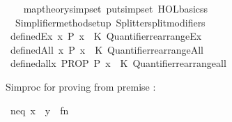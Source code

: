 \begin{isabellebody}
\isamarkupfalse%
\ {\isacartoucheopen}\isanewline
\ \ map{\isacharunderscore}{\kern0pt}theory{\isacharunderscore}{\kern0pt}simpset\ {\isacharparenleft}{\kern0pt}put{\isacharunderscore}{\kern0pt}simpset\ HOL{\isacharunderscore}{\kern0pt}basic{\isacharunderscore}{\kern0pt}ss{\isacharparenright}{\kern0pt}\ {\isacharhash}{\kern0pt}{\isachargreater}{\kern0pt}\isanewline
\ \ Simplifier{\isachardot}{\kern0pt}method{\isacharunderscore}{\kern0pt}setup\ Splitter{\isachardot}{\kern0pt}split{\isacharunderscore}{\kern0pt}modifiers\isanewline
{\isacartoucheclose}\isanewline
\isanewline
{}\isamarkupfalse%
\ defined{\isacharunderscore}{\kern0pt}Ex\ {\isacharparenleft}{\kern0pt}{\isachardoublequoteopen}{\isasymexists}x{\isachardot}{\kern0pt}\ P\ x{\isachardoublequoteclose}{\isacharparenright}{\kern0pt}\ {\isacharequal}{\kern0pt}\ {\isacartoucheopen}K\ Quantifier{}{\isachardot}{\kern0pt}rearrange{\isacharunderscore}{\kern0pt}Ex{\isacartoucheclose}\isanewline
{}\isamarkupfalse%
\ defined{\isacharunderscore}{\kern0pt}All\ {\isacharparenleft}{\kern0pt}{\isachardoublequoteopen}{\isasymforall}x{\isachardot}{\kern0pt}\ P\ x{\isachardoublequoteclose}{\isacharparenright}{\kern0pt}\ {\isacharequal}{\kern0pt}\ {\isacartoucheopen}K\ Quantifier{}{\isachardot}{\kern0pt}rearrange{\isacharunderscore}{\kern0pt}All{\isacartoucheclose}\isanewline
{}\isamarkupfalse%
\ defined{\isacharunderscore}{\kern0pt}all{\isacharparenleft}{\kern0pt}{\isachardoublequoteopen}{\isasymAnd}x{\isachardot}{\kern0pt}\ PROP\ P\ x{\isachardoublequoteclose}{\isacharparenright}{\kern0pt}\ {\isacharequal}{\kern0pt}\ {\isacartoucheopen}K\ Quantifier{}{\isachardot}{\kern0pt}rearrange{\isacharunderscore}{\kern0pt}all{\isacartoucheclose}%
\endisatagML
{\isafoldML}%
%
\isadelimML
%
\endisadelimML
%
\begin{isamarkuptext}%
Simproc for proving  from premise :%
\end{isamarkuptext}\isamarkuptrue%
%
\isadelimML
%
\endisadelimML
%
\isatagML
{}\isamarkupfalse%
\ neq\ {\isacharparenleft}{\kern0pt}{\isachardoublequoteopen}x\ {\isacharequal}{\kern0pt}\ y{\isachardoublequoteclose}{\isacharparenright}{\kern0pt}\ {\isacharequal}{\kern0pt}\ {\isacartoucheopen}fn\ {\isacharunderscore}{\kern0pt}\ {\isacharequal}{\kern0pt}{\isachargreater}{\kern0pt}\isanewline

\end{isabellebody}
